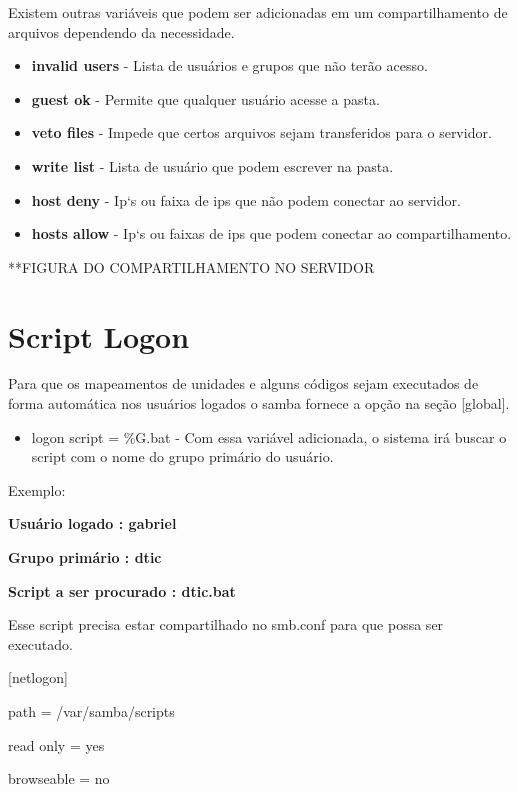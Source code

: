 Existem outras variáveis que podem ser adicionadas em um compartilhamento de arquivos dependendo da necessidade.

\begin{itemize}
	\item \textbf{invalid users} - Lista de usuários e grupos que não terão acesso.
	\item \textbf{guest ok} - Permite que qualquer usuário acesse a pasta.
	\item \textbf{veto files} - Impede que certos arquivos sejam transferidos para o servidor.
	\item \textbf{write list} - Lista de usuário que podem escrever na pasta.
	\item \textbf{host deny} - Ip`s ou faixa de ips que não podem conectar ao servidor.
	\item \textbf{hosts allow} - Ip`s ou faixas de ips que podem conectar ao compartilhamento.
\end{itemize}

**FIGURA DO COMPARTILHAMENTO NO SERVIDOR

\section{Script Logon}

Para que os mapeamentos de unidades e alguns códigos sejam executados de forma automática nos usuários logados o samba fornece a opção na seção [global]. 

\begin{itemize}
	\item {logon script = \%G.bat } - Com essa variável adicionada, o sistema irá buscar o script com o nome do grupo primário do usuário. 
\end{itemize}

Exemplo: 

\textbf{Usuário logado : gabriel}

\textbf{Grupo primário : dtic}

\textbf{Script a ser procurado : dtic.bat}

Esse script precisa estar compartilhado no smb.conf para que possa ser executado. 

	[netlogon] 

		path = /var/samba/scripts 

		read only = yes 

		browseable = no 
		

